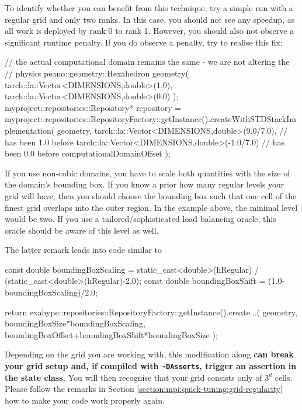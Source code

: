 To identify whether you can benefit from this technique, try a simple run with a
regular grid and only two ranks. 
In this case, you should not see any speedup, as all work is deployed by rank 0 to rank 1. 
However, you should also not observe a significant runtime penalty. 
If you do observe a penalty, try to realise this fix:


\begin{code}
// the actual computational domain remains the same - we are not altering the
// physics
peano::geometry::Hexahedron geometry(
  tarch::la::Vector<DIMENSIONS,double>(1.0),
  tarch::la::Vector<DIMENSIONS,double>(0.0) );
myproject::repositories::Repository* repository = 
  myproject::repositories::RepositoryFactory::getInstance().createWithSTDStackImplementation(
  geometry,
  tarch::la::Vector<DIMENSIONS,double>(9.0/7.0),   // has been 1.0 before
  tarch::la::Vector<DIMENSIONS,double>(-1.0/7.0)   // has been 0.0 before
  computationalDomainOffset );
\end{code}

\begin{remark}
If you use non-cubic domains, you have to scale both quantities with the size of
the domain's bounding box.
If you know a prior how many regular levels your grid will have, then you should
choose the bounding box such that one cell of the finest grid overlaps into the
outer region. 
In the example above, the minimal level would be two.
If you use a tailored/sophisticated load balancing oracle, this oracle should be
aware of this level as well.
\end{remark}

The latter remark leads into code similar to
\begin{code}
  const double boundingBoxScaling = static_cast<double>(hRegular) 
                                  / (static_cast<double>(hRegular)-2.0); 
  const double boundingBoxShift   = (1.0-boundingBoxScaling)/2.0;

  return exahype::repositories::RepositoryFactory::getInstance().create...(
      geometry,
      boundingBoxSize*boundingBoxScaling,
      boundingBoxOffset+boundingBoxShift*boundingBoxSize
  );
\end{code}


\begin{smell}
Depending on the grid you are working with, this modification along {\bf can
break your grid setup and, if compiled with \texttt{-DAsserts}, trigger an
assertion in the state class.} 
You will then recognise that your grid consists only of $3^d$ cells.
Please follow the remarks in
Section \ref{section:mpi:quick-tuning:grid-regularity} how to make your code
work properly again.
\end{smell}



